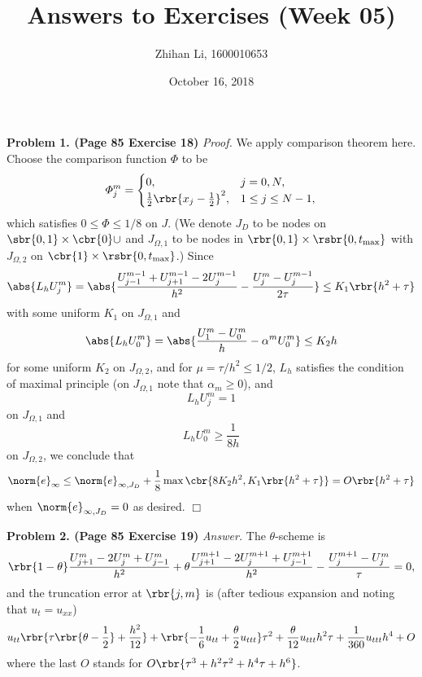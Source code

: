 \documentclass[english, nochinese]{pnote}
\title{Answers to Exercises (Week 05)}
\author{Zhihan Li, 1600010653}
\date{October 16, 2018}
\begin{document}
\maketitle

\textbf{Problem 1. (Page 85 Exercise 18)} \textit{Proof.} We apply comparison theorem here. Choose the comparison function $\varPhi$ to be
\begin{equation}
\varPhi_j^m =
\begin{cases}
0, & j = 0, N, \\
\frac{1}{2} \rbr{ x_j - \frac{1}{2} }^2, & 1 \le j \le N - 1,
\end{cases}
\end{equation}
which satisfies $ 0 \le \varPhi \le 1 / 8 $ on $J$. (We denote $J_D$ to be nodes on $ \sbr{ 0, 1 } \times \cbr{0} \cup  $ and $ J_{ \Omega, 1 } $ to be nodes in $ \rbr{ 0, 1 } \times \rsbr{ 0, t_{\text{max}} } $ with $ J_{ \Omega, 2 } $ on $ \cbr{1} \times \rsbr{ 0, t_{\text{max}} } $.) Since
\begin{equation}
\abs{ L_h U_j^m } = \abs{ \frac{ U_{ j - 1 }^{ m - 1 } + U_{ j + 1 }^{ m - 1 } - 2 U_j^{ m - 1 } }{h^2} - \frac{ U_j^m - U_j^{ m - 1 } }{ 2 \tau } } \le K_1 \rbr{ h^2 + \tau }
\end{equation}
with some uniform $K_1$ on $ J_{ \Omega, 1 } $ and
\begin{equation}
\abs{ L_h U_0^m } = \abs{ \frac{ U_1^m - U_0^m }{h} - \alpha^m U_0^m } \le K_2 h
\end{equation}
for some uniform $K_2$ on $ J_{ \Omega, 2 } $, and for $ \mu = \tau / h^2 \le 1 / 2 $, $L_h$ satisfies the condition of maximal principle (on $ J_{ \Omega, 1 }  $ note that $ \alpha_m \ge 0 $), and
\begin{equation}
L_h U_j^m = 1
\end{equation}
on $ J_{ \Omega, 1 } $ and
\begin{equation}
L_h U_0^m \ge \frac{1}{ 8 h }
\end{equation}
on $ J_{ \Omega, 2 } $, we conclude that
\begin{equation}
\norm{e}_{\infty} \le \norm{e}_{ \infty, J_D } + \frac{1}{8} \max \cbr{ 8 K_2 h^2, K_1 \rbr{ h^2 + \tau } } = O \rbr{ h^2 + \tau }
\end{equation}
when  $ \norm{e}_{ \infty, J_D } = 0 $ as desired.
\hfill$\Box$

\textbf{Problem 2. (Page 85 Exercise 19)} \textit{Answer.} The $\theta$-scheme is
\begin{equation}
\rbr{ 1 - \theta } \frac{ U_{ j + 1 }^m - 2 U_j^m + U_{ j - 1 }^m }{h^2} + \theta \frac{ U_{ j + 1 }^{ m + 1 } - 2 U_j^{ m + 1 } + U_{ j - 1 }^{ m + 1 } }{h^2} - \frac{ U_j^{ m + 1 } - U_j^m }{\tau} = 0,
\end{equation}
and the truncation error at $ \rbr{ j, m } $ is (after tedious expansion and noting that $ u_t = u_{ x x } $)
\begin{equation}
u_{ t t } \rbr{ \tau \rbr{ \theta - \frac{1}{2} } + \frac{h^2}{12} } + \rbr{ -\frac{1}{6} u_{ t t } + \frac{\theta}{2} u_{ t t t } } \tau^2 + \frac{\theta}{12} u_{ t t t } h^2 \tau + \frac{1}{360} u_{ t t t } h^4 + O
\end{equation}
where the last $O$ stands for $ O \rbr{ \tau^3 + h^2 \tau^2 + h^4 \tau + h^6 } $.
\end{document}
